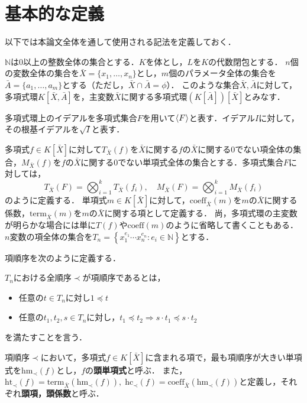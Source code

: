 \section{基本的な定義}
以下では本論文全体を通して使用される記法を定義しておく．
\par
$\mathbb{N}$は$0$以上の整数全体の集合とする．$K$を体とし，$L$を$K$の代数閉包とする．
$n$個の変数全体の集合を$\bar{X} = \{x_1, \dots, x_n\}$とし，$m$個のパラメータ全体の集合を$\bar{A} = \{a_1, \dots, a_m\}$とする（ただし，$\bar{X}\cap \bar{A} = \phi$）．
このような集合$\bar{X}, \bar{A}$に対して，多項式環$K[\bar{X}, \bar{A}]$を，主変数$\bar{X}$に関する多項式環$(K[\bar{A}])[\bar{X}]$とみなす．
\par
多項式環上のイデアルを多項式集合$F$を用いて$\langle F \rangle$と表す．イデアル$I$に対して，その根基イデアルを$\sqrt{I}$と表す．
\par
多項式$f \in K[\bar{X}]$に対して$T_{\bar{X}}(f)$を$\bar{X}$に関する$f$の$\bar{X}$に関する$0$でない項全体の集合，$M_{\bar{X}}(f)$を$f$の$\bar{X}$に関する$0$でない単項式全体の集合とする．多項式集合$F$に対しては，
$$\displaystyle T_{\bar{X}}(F) = \bigotimes_{i=1}^k T_{\bar{X}}(f_i), \quad M_{\bar{X}}(F) = \bigotimes_{i=1}^k M_{\bar{X}}(f_i)$$
のように定義する．
単項式$m \in K[\bar{X}]$に対して，$\mathrm{coeff}_{\bar{X}}(m)$を$m$の$\bar{X}$に関する係数，$\mathrm{term}_{\bar{X}}(m)$を$m$の$\bar{X}$に関する項として定義する．
尚，多項式環の主変数が明らかな場合には単に$T(f)$や$\mathrm{coeff}(m)$のように省略して書くこともある．
$n$変数の項全体の集合を$T_n = \left\{ x_1^{e_1} \cdots x_n^{e_n} : e_i \in \mathbb{N} \right\}$とする．
\par
項順序を次のように定義する．
\begin{definition}[項順序]
	$T_n$における全順序$\prec$が項順序であるとは，
	\begin{itemize}
		\item 任意の$t \in T_n$に対し$1 \preceq t$
		\item 任意の$t_1, t_2, s \in T_n$に対し，$t_1 \preceq t_2 \Longrightarrow s\cdot t_1 \preceq s\cdot t_2$
	\end{itemize}
	を満たすことを言う．
\end{definition}
項順序$\prec$において，多項式$f\in K[\bar{X}]$に含まれる項で，最も項順序が大きい単項式を$\mathrm{hm}_{\prec}(f)$とし，$f$の\textbf{頭単項式}と呼ぶ．
また，
$\mathrm{ht}_{\prec}(f) = \mathrm{term}_{\bar{X}}(\mathrm{hm}_{\prec}(f)), \; \mathrm{hc}_{\prec}(f) = \mathrm{coeff}_{\bar{X}}(\mathrm{hm}_{\prec}(f))$と定義し，それぞれ\textbf{頭項，頭係数}と呼ぶ．
